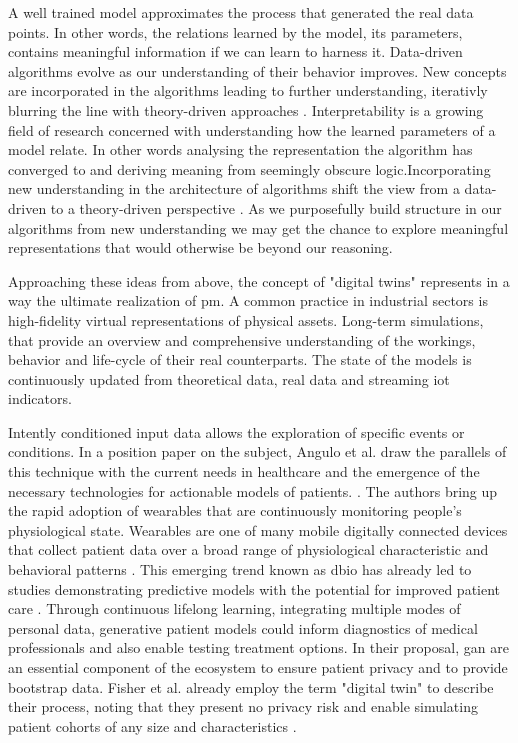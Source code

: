             A well trained model approximates the process that generated the real data points. In other words, the relations learned by the model, its parameters, contains meaningful information if we can learn to harness it. Data-driven algorithms evolve as our understanding of their behavior improves. New concepts are incorporated in the algorithms leading to further understanding, iterativly blurring the line with theory-driven approaches \cite{Hand2019}. Interpretability is a growing field of research concerned with understanding how the learned parameters of a model relate. In other words analysing the representation the algorithm has converged to and deriving meaning from seemingly obscure logic.Incorporating new understanding in the architecture of algorithms shift the view from a data-driven to a theory-driven perspective \cite{Hand2019}. As we purposefully build structure in our algorithms from new understanding we may get the chance to explore meaningful representations that would otherwise be beyond our reasoning.\par 
            
            Approaching these ideas from above, the concept of "digital twins" represents in a way the ultimate realization of \gls{pm}. A common practice in industrial sectors is high-fidelity virtual representations of physical assets. Long-term simulations, that provide an overview and comprehensive understanding of the workings, behavior and life-cycle of their real counterparts. The state of the models is continuously updated from theoretical data, real data and streaming \gls{iot} indicators.\par
            Intently conditioned input data allows the exploration of specific events or conditions. In a position paper on the subject, Angulo et al. draw the parallels of this technique with the current needs in healthcare and the emergence of the necessary technologies for actionable models of patients. \cite{angulo2019towards,Angulo_2020}. The authors bring up the rapid adoption of wearables that are continuously monitoring people's physiological state. 
            Wearables are one of many mobile digitally connected devices that collect patient data over a broad range of physiological characteristic and behavioral patterns \cite{coravos2019developing}. This emerging trend known as \gls{dbio} has already led to studies demonstrating predictive models with the potential for improved patient care \cite{snyder2018best}. Through continuous lifelong learning, integrating  multiple modes of personal data, generative patient models could inform diagnostics of medical professionals and also enable testing treatment options. In their proposal, \gls{gan} are an essential component of the ecosystem to ensure patient privacy and to provide bootstrap data. Fisher et al. already employ the term "digital twin" to describe their process, noting that they present no privacy risk and enable simulating patient cohorts of any size and characteristics \cite{walsh2020generating}.
        
